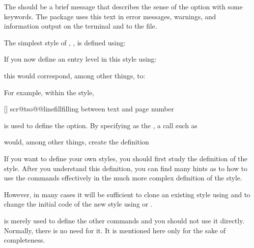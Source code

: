 The  should be a brief message that describes the sense
of the option with some keywords. The  package uses this text
in error messages, warnings, and information output on the terminal and to the
 file.

The simplest style of , , is defined
using:
\begin{lstcode}
\end{lstcode}
If you now define an entry level  in this style using:
\begin{lstcode}
\end{lstcode}
this would correspond, among other things, to:
\begin{lstcode}
  \def\dummytocdepth{1}
  \def\l@dummy#1#2{}
\end{lstcode}

For example, within the  style,
\begin{lstcode}
  [\TOCLineLeaderFill]%
  {scr@tso@}{@linefill}{filling between text and page number}%
\end{lstcode}
is used to define the  option. By specifying
 as the ,
a call such as
\begin{lstcode}
\end{lstcode}
would, among other things, create the definition
\begin{lstcode}
  \def\scr@tso@part@linefill{\TOCLineLeaderFill}
\end{lstcode}

If you want to define your own styles, you should first study the definition
of the  style. After you understand this definition, you
can find many hints as to how to use the commands effectively in the much more
complex definition of the  style.

However, in many cases it will be sufficient to clone an existing style using
 and to change the initial code of
the new style using  or
.

 is merely used to define the other commands and
you should not use it directly. Normally, there is no need for it. It is
mentioned here only for the sake of completeness.%
\EndIndexGroup


